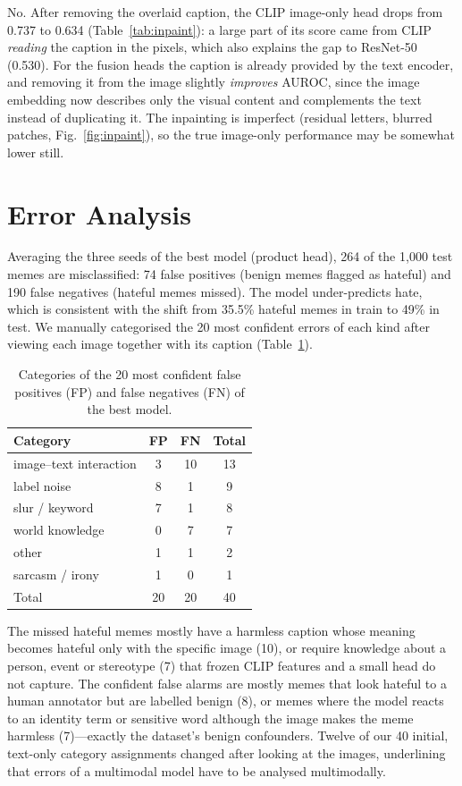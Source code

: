 \documentclass[conference]{IEEEtran}
\begin{document}
No. After removing the overlaid caption, the CLIP image-only head drops from 0.737 to 0.634
(Table~\ref{tab:inpaint}): a large part of its score came from CLIP \emph{reading} the caption in the pixels, which
also explains the gap to ResNet-50 (0.530). For the fusion heads the caption is already provided by the text encoder,
and removing it from the image slightly \emph{improves} AUROC, since the image embedding now describes only the
visual content and complements the text instead of duplicating it. The inpainting is imperfect (residual letters,
blurred patches, Fig.~\ref{fig:inpaint}), so the true image-only performance may be somewhat lower still.

\section{Error Analysis}
\label{sec:errors}
Averaging the three seeds of the best model (product head), 264 of the 1{,}000 test memes are misclassified:
74 false positives (benign memes flagged as hateful) and 190 false negatives (hateful memes missed). The model
under-predicts hate, which is consistent with the shift from 35.5\% hateful memes in train to 49\% in test. We
manually categorised the 20 most confident errors of each kind after viewing each image together with its caption
(Table~\ref{tab:errors}).

\begin{table}[t]
\centering
\caption{Categories of the 20 most confident false positives (FP) and false negatives (FN) of the best model.}
\label{tab:errors}
\begin{tabular}{lccc}
\toprule
Category & FP & FN & Total \\
\midrule
image--text interaction & 3 & 10 & 13 \\
label noise & 8 & 1 & 9 \\
slur / keyword & 7 & 1 & 8 \\
world knowledge & 0 & 7 & 7 \\
other & 1 & 1 & 2 \\
sarcasm / irony & 1 & 0 & 1 \\
\midrule
Total & 20 & 20 & 40 \\
\bottomrule
\end{tabular}
\end{table}

The missed hateful memes mostly have a harmless caption whose meaning becomes hateful only with the specific image
(10), or require knowledge about a person, event or stereotype (7) that frozen CLIP features and a small head do not
capture. The confident false alarms are mostly memes that look hateful to a human annotator but are labelled benign
(8), or memes where the model reacts to an identity term or sensitive word although the image makes the meme harmless
(7)---exactly the dataset's benign confounders. Twelve of our 40 initial, text-only category assignments changed
after looking at the images, underlining that errors of a multimodal model have to be analysed multimodally.
\end{document}
